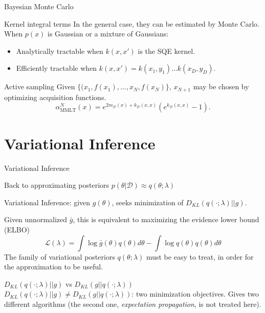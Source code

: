 \documentclass[pdf]{beamer}
\def \gu {{\bar{g}}}
\begin{document}
\begin{frame}{Bayesian Monte Carlo}
\begin{block}{Kernel integral terms}
In the general case, they can be estimated by Monte Carlo.
When $p(x)$ is Gaussian or a mixture of Gaussians:
\begin{itemize}
	\item Analytically tractable when $k(x,x')$ is the SQE kernel.
	\item Efficiently tractable when $k(x,x') = k(x_1,y_1) \ldots k(x_D,y_D)$.
\end{itemize}
\begin{block}{Active sampling}
	Given $\{(x_1,f(x_1),\ldots,x_N,f(x_N)\}$, $x_{N+1}$ may be chosen by optimizing acquisition functions.
\begin{equation*}
\alpha^N_{\text{MMLT}}(x) = e^{2 m_\mathcal{D}(x) + k_\mathcal{D}(x,x)} \left(e^{k_\mathcal{D}(x,x)}-1\right).
\end{equation*}
\end{block}
\end{block}
\end{frame}

\section{Variational Inference}
\begin{frame}{Variational Inference}
\begin{block}{Back to approximating posteriors $p(\theta|\mathcal{D}) \approx q(\theta;\lambda)$}

Variational Inference: given $g(\theta)$, seeks minimization of $D_{KL}(q(\cdot;\lambda)||g)$.

Given unnormalized $\gu$, this is equivalent to maximizing the evidence lower bound (ELBO) 
\begin{equation*}
\mathcal{L}(\lambda) = 
\int \log \gu(\theta) q(\theta) d\theta - \int \log q(\theta) q(\theta) d\theta
\end{equation*}
The family of variational posteriors $q(\theta;\lambda)$ must be easy to treat, in order for the approximation to be useful.


\end{block}
\begin{block}{$D_{KL}(q(\cdot;\lambda)||g)$ vs $D_{KL}(g||q(\cdot;\lambda))$}
$D_{KL}(q(\cdot;\lambda)||g) \neq D_{KL}(g||q(\cdot;\lambda))$: two minimization objectives. Gives two different algorithms (the second one, \textit{expectation propagation}, is not treated here).

\end{block}
\end{frame}
\end{document}
